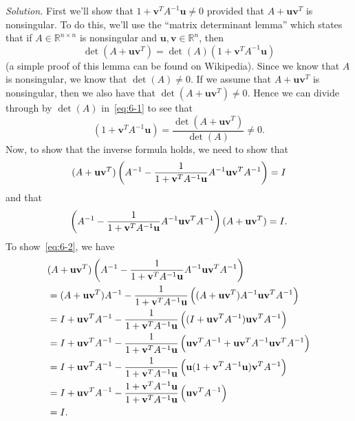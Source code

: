 \documentclass{article}
\def\*#1{\mathbf{#1}}
\newcommand{\R}{\mathbb{R}}
\begin{document}
\textit{Solution.}
First we'll show that $1 + \*v^T A^{-1} \*u \neq 0$ provided that
$A + \*u \*v^T$ is nonsingular. To do this, we'll use the
``matrix determinant lemma'' which states that if $A \in \R^{n \times n}$
is nonsingular and $\*u, \*v \in \R^n$, then
%
\begin{equation}
    \det(A + \*u \*v^T) = \det(A) (1 + \*v^T A^{-1} \*u)
    \label{eq:6-1}
\end{equation}
%
(a simple proof of this lemma can be found on Wikipedia). Since
we know that $A$ is nonsingular, we know that $\det(A) \neq 0$.
If we assume that $A + \*u \*v^T$ is nonsingular, then we also
have that $\det(A + \*u \*v^T) \neq 0$. Hence we can divide through by
$\det(A)$ in~\eqref{eq:6-1} to see that
%
\begin{equation*}
    (1 + \*v^T A^{-1} \*u) = \frac{\det(A + \*u \*v^T)}{\det(A)} \neq 0
    .
\end{equation*}
%
Now, to show that the inverse formula holds, we need to show that
%
\begin{equation}
    (A + \*u \*v^T) \del{A^{-1} - \frac{1}{1 + \*v^T A^{-1} \*u} A^{-1} \*u \*v^T A^{-1}} = I
    \label{eq:6-2}
\end{equation}
%
and that
%
\begin{equation}
    \del{A^{-1} - \frac{1}{1 + \*v^T A^{-1} \*u} A^{-1} \*u \*v^T A^{-1}} (A + \*u \*v^T) = I
    \label{eq:6-3}
    .
\end{equation}
%
To show~\eqref{eq:6-2}, we have
%
\begin{align*}
    &(A + \*u \*v^T) \del{A^{-1} - \frac{1}{1 + \*v^T A^{-1} \*u} A^{-1} \*u \*v^T A^{-1}} \\
    &= (A + \*u \*v^T) A^{-1}
        - \frac{1}{1 + \*v^T A^{-1} \*u}
            \del{
                (A + \*u \*v^T) A^{-1} \*u \*v^T A^{-1}
            }
        \\
    &= I + \*u \*v^T A^{-1}
        - \frac{1}{1 + \*v^T A^{-1} \*u}
            \del{
                (I + \*u \*v^T A^{-1}) \*u \*v^T A^{-1}
            }
        \\
    &= I + \*u \*v^T A^{-1}
        - \frac{1}{1 + \*v^T A^{-1} \*u}
            \del{
                \*u \*v^T A^{-1} + \*u \*v^T A^{-1} \*u \*v^T A^{-1}
            }
        \\
    &= I + \*u \*v^T A^{-1}
        - \frac{1}{1 + \*v^T A^{-1} \*u}
            \del{
                \*u (1 + \*v^T A^{-1} \*u) \*v^T A^{-1}
            }
        \\
    &= I + \*u \*v^T A^{-1}
        - \frac{1 + \*v^T A^{-1} \*u}{1 + \*v^T A^{-1} \*u}
            \del{
                \*u \*v^T A^{-1}
            }
        \\
    &= I
    .
\end{align*}
\end{document}
